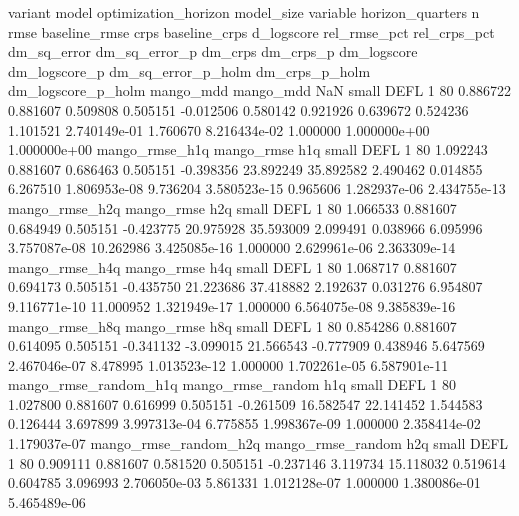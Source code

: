               variant             model optimization_horizon model_size variable  horizon_quarters  n     rmse  baseline_rmse     crps  baseline_crps  d_logscore  rel_rmse_pct  rel_crps_pct  dm_sq_error  dm_sq_error_p   dm_crps    dm_crps_p  dm_logscore  dm_logscore_p  dm_sq_error_p_holm  dm_crps_p_holm  dm_logscore_p_holm
            mango_mdd         mango_mdd                  NaN      small     DEFL                 1 80 0.886722       0.881607 0.509808       0.505151   -0.012506      0.580142      0.921926     0.639672       0.524236  1.101521 2.740149e-01     1.760670   8.216434e-02            1.000000    1.000000e+00        1.000000e+00
       mango_rmse_h1q        mango_rmse                  h1q      small     DEFL                 1 80 1.092243       0.881607 0.686463       0.505151   -0.398356     23.892249     35.892582     2.490462       0.014855  6.267510 1.806953e-08     9.736204   3.580523e-15            0.965606    1.282937e-06        2.434755e-13
       mango_rmse_h2q        mango_rmse                  h2q      small     DEFL                 1 80 1.066533       0.881607 0.684949       0.505151   -0.423775     20.975928     35.593009     2.099491       0.038966  6.095996 3.757087e-08    10.262986   3.425085e-16            1.000000    2.629961e-06        2.363309e-14
       mango_rmse_h4q        mango_rmse                  h4q      small     DEFL                 1 80 1.068717       0.881607 0.694173       0.505151   -0.435750     21.223686     37.418882     2.192637       0.031276  6.954807 9.116771e-10    11.000952   1.321949e-17            1.000000    6.564075e-08        9.385839e-16
       mango_rmse_h8q        mango_rmse                  h8q      small     DEFL                 1 80 0.854286       0.881607 0.614095       0.505151   -0.341132     -3.099015     21.566543    -0.777909       0.438946  5.647569 2.467046e-07     8.478995   1.013523e-12            1.000000    1.702261e-05        6.587901e-11
mango_rmse_random_h1q mango_rmse_random                  h1q      small     DEFL                 1 80 1.027800       0.881607 0.616999       0.505151   -0.261509     16.582547     22.141452     1.544583       0.126444  3.697899 3.997313e-04     6.775855   1.998367e-09            1.000000    2.358414e-02        1.179037e-07
mango_rmse_random_h2q mango_rmse_random                  h2q      small     DEFL                 1 80 0.909111       0.881607 0.581520       0.505151   -0.237146      3.119734     15.118032     0.519614       0.604785  3.096993 2.706050e-03     5.861331   1.012128e-07            1.000000    1.380086e-01        5.465489e-06
